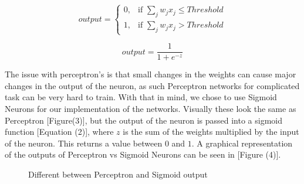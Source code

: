 \documentclass{sig-alternate-05-2015}
\begin{document}
\begin{equation}
output =
\left\{
	\begin{array}{ll}
		0, & \mbox{if } \sum_j  w_j x_j \leq Threshold \\
		1, & \mbox{if } \sum_j  w_j x_j > Threshold
	\end{array}
\right.
\end{equation}

\begin{equation}
output = \frac{1}{1+e^{-z}}
\end{equation}



	
	The issue with perceptron's is that small changes in the weights can cause major changes in the output of the neuron, as such Perceptron networks for complicated task can be very hard to train. With that in mind, we chose to use Sigmoid Neurons for our implementation of the networks. Visually these look the same as Perceptron [Figure(3)], but the output of the neuron is passed into a sigmoid function [Equation (2)], where $z$ is the sum of the weights multiplied by the input of the neuron. This returns a value between $0$ and $1$. A graphical representation of the outputs of Perceptron vs Sigmoid Neurons can be seen in [Figure (4)].
	
\begin{figure}[h!]
\centering
{}
\caption{Different between Perceptron and Sigmoid output}
\label{fig:graph5}
\end{figure}
	
\end{document}
